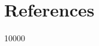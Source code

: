 \documentclass[pdf]{beamer}
\theoremstyle{remark}
\theoremstyle{definition}
\begin{document}
\section{References}

\begin{frame}[t,allowframebreaks]
 10000
\small


\end{frame}
\end{document}
